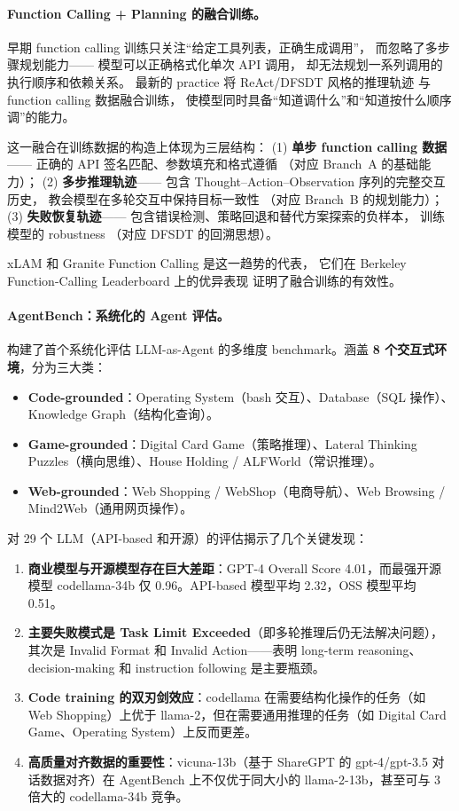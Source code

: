 \paragraph{Function Calling + Planning 的融合训练。}
早期 function calling 训练只关注``给定工具列表，正确生成调用''，
而忽略了多步骤规划能力——
模型可以正确格式化单次 API 调用，
却无法规划一系列调用的执行顺序和依赖关系。
最新的 practice 将 ReAct/DFSDT 风格的推理轨迹
与 function calling 数据融合训练，
使模型同时具备``知道调什么''和``知道按什么顺序调''的能力。

这一融合在训练数据的构造上体现为三层结构：
(1) \textbf{单步 function calling 数据}——
正确的 API 签名匹配、参数填充和格式遵循
（对应 Branch~A 的基础能力）；
(2) \textbf{多步推理轨迹}——
包含 Thought--Action--Observation 序列的完整交互历史，
教会模型在多轮交互中保持目标一致性
（对应 Branch~B 的规划能力）；
(3) \textbf{失败恢复轨迹}——
包含错误检测、策略回退和替代方案探索的负样本，
训练模型的 robustness
（对应 DFSDT 的回溯思想）。

xLAM \citep{zhang2024xlam} 和 Granite Function Calling \citep{abdelaziz2024granite}
是这一趋势的代表，
它们在 Berkeley Function-Calling Leaderboard 上的优异表现
证明了融合训练的有效性。

\paragraph{AgentBench：系统化的 Agent 评估。}
 构建了首个系统化评估 LLM-as-Agent 的多维度 benchmark。涵盖 \textbf{8 个交互式环境}，分为三大类：
\begin{itemize}[leftmargin=*]
  \item \textbf{Code-grounded}：Operating System（bash 交互）、Database（SQL 操作）、Knowledge Graph（结构化查询）。
  \item \textbf{Game-grounded}：Digital Card Game（策略推理）、Lateral Thinking Puzzles（横向思维）、House Holding / ALFWorld（常识推理）。
  \item \textbf{Web-grounded}：Web Shopping / WebShop（电商导航）、Web Browsing / Mind2Web（通用网页操作）。
\end{itemize}

对 29 个 LLM（API-based 和开源）的评估揭示了几个关键发现：
\begin{enumerate}[leftmargin=*]
  \item \textbf{商业模型与开源模型存在巨大差距}：GPT-4 Overall Score 4.01，而最强开源模型 codellama-34b 仅 0.96。API-based 模型平均 2.32，OSS 模型平均 0.51。
  \item \textbf{主要失败模式是 Task Limit Exceeded}（即多轮推理后仍无法解决问题），其次是 Invalid Format 和 Invalid Action——表明 long-term reasoning、decision-making 和 instruction following 是主要瓶颈。
  \item \textbf{Code training 的双刃剑效应}：codellama 在需要结构化操作的任务（如 Web Shopping）上优于 llama-2，但在需要通用推理的任务（如 Digital Card Game、Operating System）上反而更差。
  \item \textbf{高质量对齐数据的重要性}：vicuna-13b（基于 ShareGPT 的 gpt-4/gpt-3.5 对话数据对齐）在 AgentBench 上不仅优于同大小的 llama-2-13b，甚至可与 3 倍大的 codellama-34b 竞争。
\end{enumerate}


